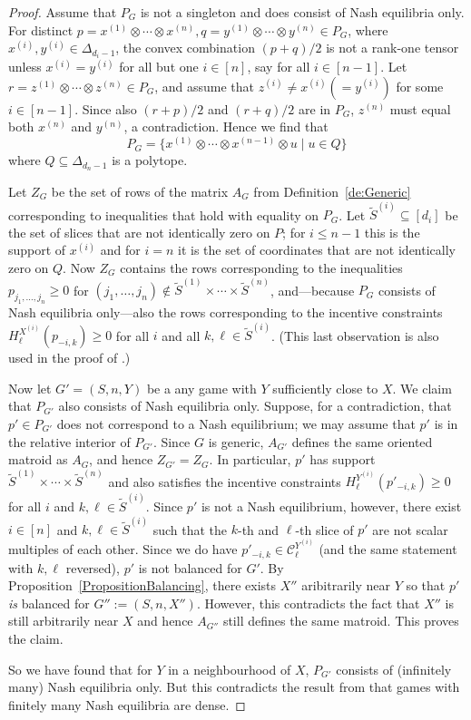 \documentclass[11pt]{amsart}
\theoremstyle{definition}
\numberwithin{subcase}{case}
\renewcommand{\tilde}[1]{\widetilde{#1}}
\begin{document}
\begin{proof}
    Assume that $P_G$ is not a singleton and does consist of Nash equilibria only. For distinct $p=x^{(1)} \otimes \cdots \otimes x^{(n)}, q=y^{(1)} \otimes \cdots \otimes y^{(n)} \in P_G$, where $x^{(i)},y^{(i)} \in \Delta_{d_i-1}$, the convex combination $(p+q)/2$ is not a rank-one tensor unless $x^{(i)}=y^{(i)}$ for all but one $i \in [n]$, say for all $i \in [n-1]$. Let $r=z^{(1)}\otimes \cdots \otimes z^{(n)} \in P_G$, and assume that $z^{(i)} \neq x^{(i)} (=y^{(i)})$ for some $i \in [n-1]$. Since also $(r+p)/2$ and $(r+q)/2$ are in $P_G$, $z^{(n)}$ must equal both $x^{(n)}$ and $y^{(n)}$, a contradiction. Hence we find that 
    \[ P_G=\{x^{(1)} \otimes \cdots \otimes x^{(n-1)} \otimes u \mid u \in Q\} \]
    where $Q \subseteq \Delta_{d_n-1}$ is a polytope.

    Let $Z_G$ be the set of rows of the matrix $A_G$ from Definition~\ref{de:Generic} corresponding to inequalities that hold with equality on $P_G$. Let $\tilde{S}^{(i)} \subseteq [d_i]$ be the set of slices that are not identically zero on $P$; for $i \leq n-1$ this is the support of $x^{(i)}$ and for $i=n$ it is the set of coordinates that are not identically zero on $Q$. Now $Z_G$ contains the rows corresponding to the inequalities $p_{j_1,\ldots,j_n} \geq 0$ for $(j_1,\ldots,j_n) \not \in \tilde{S}^{(1)} \times \cdots \times \tilde{S}^{(n)}$, and---because $P_G$ consists of Nash equilibria only---also the rows corresponding to the incentive constraints $H_\ell^{X^{(i)}}(p_{-i,k}) \geq 0$ for all $i$ and all $k,\ell \in \tilde{S}^{(i)}$. (This last observation is also used in the proof of \cite[Proposition 2]{NGH03}.)

    Now let $G'=(S,n,Y)$ be a any game with $Y$ sufficiently close to $X$. We claim that $P_{G'}$ also consists of Nash equilibria only. Suppose, for a contradiction, that $p' \in P_{G'}$ does not correspond to a Nash equilibrium; we may assume that $p'$ is in the relative interior of $P_{G'}$. Since $G$ is generic, $A_{G'}$ defines the same oriented matroid as $A_G$, and hence $Z_{G'}=Z_G$. In particular, $p'$ has support $\tilde{S}^{(1)} \times \cdots \times \tilde{S}^{(n)}$ and also satisfies the incentive constraints $H^{Y^{(i)}}_\ell(p'_{-i,k}) \geq 0$ for all $i$ and $k,\ell \in \tilde{S}^{(i)}$. Since $p'$ is not a Nash equilibrium, however, there exist $i \in [n]$ and $k,\ell \in \tilde{S}^{(i)}$ such that the $k$-th and $\ell$-th slice of $p'$ are not scalar multiples of each other. Since we do have $p'_{-i,k} \in \mathcal{C}^{Y^{(i)}}_\ell$ (and the same statement with $k,\ell$ reversed), $p'$ is not balanced for $G'$. By Proposition~\ref{PropositionBalancing}, there exists $X''$ aribitrarily near $Y$ so that $p'$ {\em is} balanced for $G'':=(S,n,X'')$. However, this contradicts the fact that $X''$ is still arbitrarily near $X$ and hence $A_{G''}$ still defines the same matroid. This proves the claim.

    So we have found that for $Y$ in a neighbourhood of $X$, $P_{G'}$ consists of (infinitely many) Nash equilibria only. But this contradicts the result from \cite{Harsanyi73} that games with finitely many Nash equilibria are dense.
\end{proof}
\end{document}
